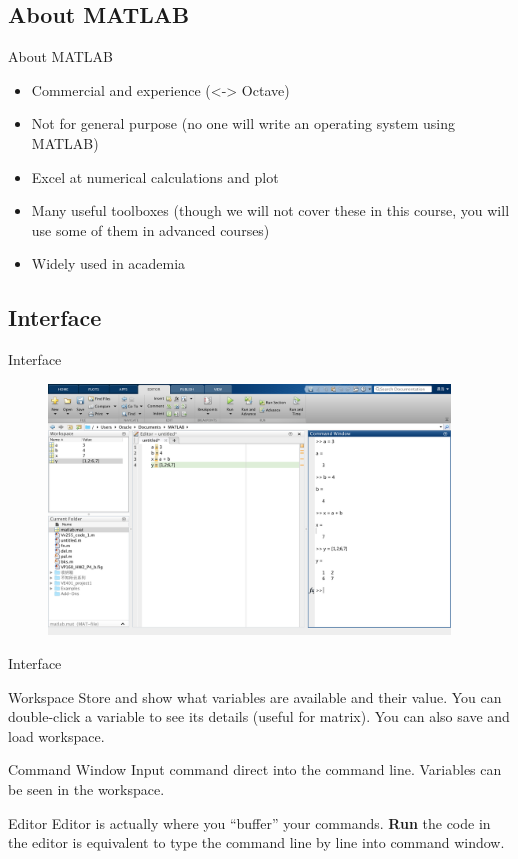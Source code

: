 \subsection{About MATLAB}
\begin{frame}{About MATLAB}
\begin{itemize}
\item Commercial and experience (<-> Octave)
\item Not for general purpose (no one will write an operating system using MATLAB)
\item Excel at numerical calculations and plot
\item Many useful toolboxes (though we will not cover these in this course, you will use some of them in advanced courses)
\item Widely used in academia
\end{itemize}
\end{frame}

\subsection{Interface}
\begin{frame}{Interface}
\begin{figure}[htbp]
\centering
\includegraphics[width=0.95\textwidth]{pic/window.png}
\end{figure}
\end{frame}

\begin{frame}{Interface}
\begin{block}{Workspace}
Store and show what variables are available and their value. You can double-click a variable to see its details (useful for matrix). You can also save and load workspace.
\end{block}
\begin{block}{Command Window}
Input command direct into the command line. Variables can be seen in the workspace.
\end{block}
\begin{block}{Editor}
Editor is actually where you ``buffer'' your commands. \textbf{Run} the code in the editor is equivalent to type the command line by line into command window.
\end{block}
\end{frame}



